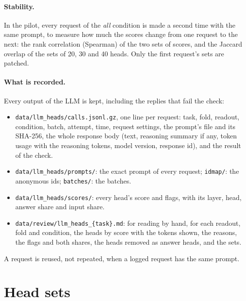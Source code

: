 \documentclass[11pt,a4paper]{article}
\begin{document}
\paragraph{Stability.} In the pilot, every request of the \emph{all} condition is made a second time with the same prompt, to measure how much the scores change from one request to the next: the rank correlation (Spearman) of the two sets of scores, and the Jaccard overlap of the sets of 20, 30 and 40 heads. Only the first request's sets are patched.

\paragraph{What is recorded.} Every output of the LLM is kept, including the replies that fail the check:
\begin{itemize}
  \item \texttt{data/llm\_heads/calls.jsonl.gz}, one line per request: task, fold, readout, condition, batch, attempt, time, request settings, the prompt's file and its SHA-256, the whole response body (text, reasoning summary if any, token usage with the reasoning tokens, model version, response id), and the result of the check.
  \item \texttt{data/llm\_heads/prompts/}: the exact prompt of every request; \texttt{idmap/}: the anonymous ids; \texttt{batches/}: the batches.
  \item \texttt{data/llm\_heads/scores/}: every head's score and flags, with its layer, head, answer share and input share.
  \item \texttt{data/review/llm\_heads\_\{task\}.md}: for reading by hand, for each readout, fold and condition, the heads by score with the tokens shown, the reasons, the flags and both shares, the heads removed as answer heads, and the sets.
\end{itemize}
A request is reused, not repeated, when a logged request has the same prompt.

\section{Head sets}\label{sec:sets}
\end{document}
